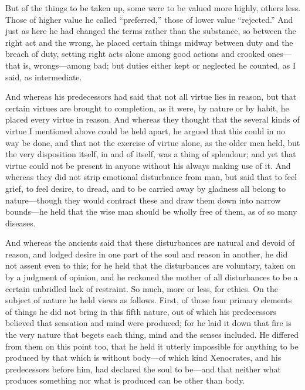  But of the things to be taken up, some were to be valued more highly, others less. Those of higher value he called ``preferred,'' those of lower value ``rejected.'' And just as here he had changed the terms rather than the substance, so between the right act and the wrong, he placed certain things midway between duty and the breach of duty, setting right acts alone among good actions and crooked ones—that is, wrongs—among bad; but duties either kept or neglected he counted, as I said, as intermediate.

 And whereas his predecessors had said that not all virtue lies in reason, but that certain virtues are brought to completion, as it were, by nature or by habit, he placed every virtue in reason. And whereas they thought that the several kinds of virtue I mentioned above could be held apart, he argued that this could in no way be done, and that not the exercise of virtue alone, as the older men held, but the very disposition itself, in and of itself, was a thing of splendour; and yet that virtue could not be present in anyone without his always making use of it. And whereas they did not strip emotional disturbance from man, but said that to feel grief, to feel desire, to dread, and to be carried away by gladness all belong to nature—though they would contract these and draw them down into narrow bounds—he held that the wise man should be wholly free of them, as of so many diseases.

 And whereas the ancients said that these disturbances are natural and devoid of reason, and lodged desire in one part of the soul and reason in another, he did not assent even to this; for he held that the disturbances are voluntary, taken on by a judgment of opinion, and he reckoned the mother of all disturbances to be a certain unbridled lack of restraint. So much, more or less, for ethics. On the subject of nature he held views as follows. First, of those four primary elements of things he did not bring in this fifth nature, out of which his predecessors believed that sensation and mind were produced; for he laid it down that fire is the very nature that begets each thing, mind and the senses included. He differed from them on this point too, that he held it utterly impossible for anything to be produced by that which is without body—of which kind Xenocrates, and his predecessors before him, had declared the soul to be—and that neither what produces something nor what is produced can be other than body.

